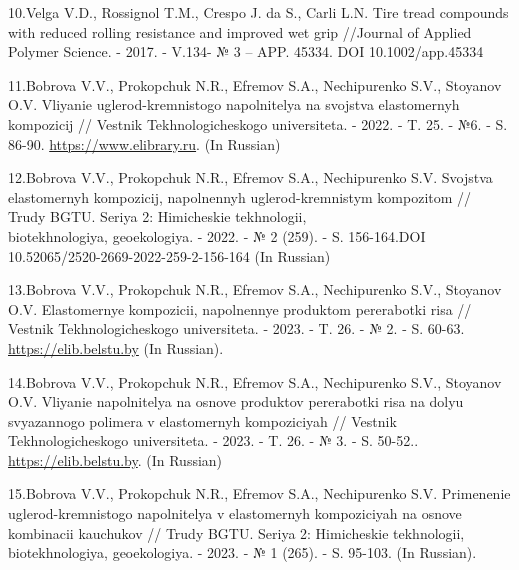 \begin{references}
10.Velga V.D., Rossignol T.M., Crespo J. da S., Carli L.N. Tire tread
compounds with reduced rolling resistance and improved wet grip
//Journal of Applied Polymer Science. - 2017. - V.134- № 3 -- APP.
45334. DOI 10.1002/app.45334

11.Bobrova V.V., Prokopchuk N.R., Efremov S.A., Nechipurenko S.V.,
Stoyanov O.V. Vliyanie uglerod-kremnistogo napolnitelya na svojstva
elastomernyh kompozicij // Vestnik Tekhnologicheskogo universiteta. -
2022. - T. 25. - №6. - S. 86-90.
\href{https://www.elibrary.ru/item.asp?id=48660622}{https://www.elibrary.ru}. (In Russian)

12.Bobrova V.V., Prokopchuk N.R., Efremov S.A., Nechipurenko S.V.
Svojstva elastomernyh kompozicij, napolnennyh uglerod-kremnistym
kompozitom // Trudy BGTU. Seriya 2: Himicheskie tekhnologii,
\\biotekhnologiya, geoekologiya. - 2022. - № 2 (259). - S. 156-164.DOI
10.52065/2520-2669-2022-259-2-156-164 (In Russian)

13.Bobrova V.V., Prokopchuk N.R., Efremov S.A., Nechipurenko S.V.,
Stoyanov O.V. Elastomernye kompozicii, napolnennye produktom pererabotki
risa // Vestnik Tekhnologicheskogo universiteta. - 2023. - T. 26. - № 2.
- S. 60-63. \href{https://elib.belstu.by/handle/123456789/65005/}{https://elib.belstu.by} (In Russian).

14.Bobrova V.V., Prokopchuk N.R., Efremov S.A., Nechipurenko S.V.,
Stoyanov O.V. Vliyanie napolnitelya na osnove produktov pererabotki risa
na dolyu svyazannogo polimera v elastomernyh kompoziciyah // Vestnik
Tekhnologicheskogo universiteta. - 2023. - T. 26. - № 3. - S.
50-52.. \href{https://elib.belstu.by/handle/123456789/65006}{https://elib.belstu.by}. (In Russian)

15.Bobrova V.V., Prokopchuk N.R., Efremov S.A., Nechipurenko S.V.
Primenenie uglerod-kremnistogo napolnitelya v elastomernyh kompoziciyah
na osnove kombinacii kauchukov // Trudy BGTU. Seriya 2: Himicheskie
tekhnologii, biotekhnologiya, geoekologiya. - 2023. - № 1 (265). - S.
95-103. (In Russian).
\end{references}

